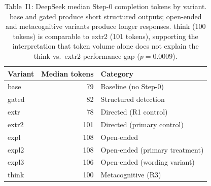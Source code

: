 \documentclass[11pt,a4paper]{article}
\begin{document}
\begin{table}[htbp]
\centering
\caption{Table~I1: DeepSeek median Step-0 completion tokens by variant.
  \textsf{base} and \textsf{gated} produce short structured outputs;
  open-ended and metacognitive variants produce longer responses.
  \textsf{think} (100 tokens) is comparable to \textsf{extr2} (101 tokens),
  supporting the interpretation that token volume alone does not explain
  the \textsf{think} vs.\ \textsf{extr2} performance gap ($p = 0.0009$).}
\label{tab:i1}
\smallskip
\begin{tabular}{@{}lrl@{}}
\toprule
Variant & Median tokens & Category \\
\midrule
\textsf{base}   &  79 & Baseline (no Step-0) \\
\textsf{gated}  &  82 & Structured detection \\
\textsf{extr}   &  78 & Directed (R1 control) \\
\textsf{extr2}  & 101 & Directed (primary control) \\
\textsf{expl}   & 108 & Open-ended \\
\textsf{expl2}  & 108 & Open-ended (primary treatment) \\
\textsf{expl3}  & 106 & Open-ended (wording variant) \\
\textsf{think}  & 100 & Metacognitive (R3) \\
\bottomrule
\end{tabular}
\end{table}
\end{document}
